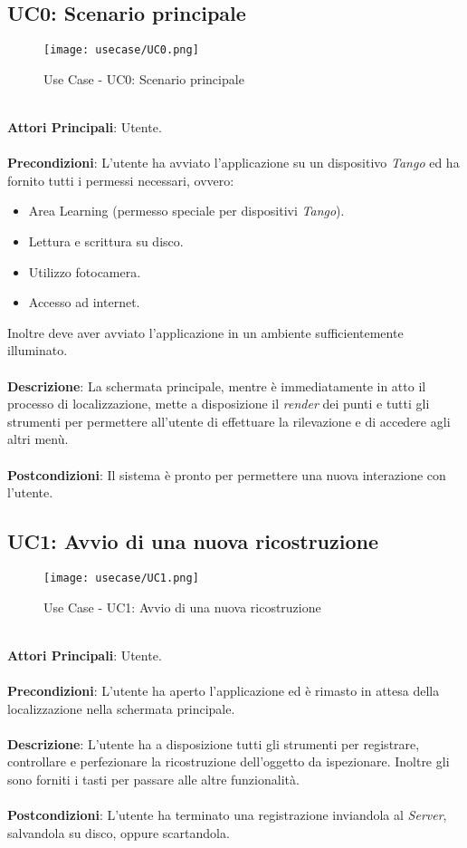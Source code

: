 \subsection{UC0: Scenario principale}
\begin{figure}[H] 
    \centering 
    \texttt{[image: usecase/UC0.png]} 
    \caption{Use Case - UC0: Scenario principale}
\end{figure}
\ \\
\textbf{Attori Principali}: Utente.
\\\\ \textbf{Precondizioni}: L'utente ha avviato l'applicazione su un dispositivo \emph{Tango} ed ha fornito tutti i permessi necessari, ovvero:
\begin{itemize}
	\item Area Learning (permesso speciale per dispositivi \emph{Tango}).
	\item Lettura e scrittura su disco.
	\item Utilizzo fotocamera.
	\item Accesso ad internet.
\end{itemize}
Inoltre deve aver avviato l'applicazione in un ambiente sufficientemente illuminato.
\\\\ \textbf{Descrizione}: La schermata principale, mentre è immediatamente in atto il processo di localizzazione, mette a disposizione il \emph{render} dei punti e tutti gli strumenti per permettere all'utente di effettuare la rilevazione e di accedere agli altri menù.
\\\\ \textbf{Postcondizioni}: Il sistema è pronto per permettere una nuova interazione con l'utente.


\subsection{UC1: Avvio di una nuova ricostruzione}
\begin{figure}[H] 
    \centering 
    \texttt{[image: usecase/UC1.png]} 
    \caption{Use Case - UC1: Avvio di una nuova ricostruzione}
\end{figure}
\ \\
\textbf{Attori Principali}: Utente.
\\\\ \textbf{Precondizioni}: L'utente ha aperto l'applicazione ed è rimasto in attesa della localizzazione nella schermata principale.
\\\\ \textbf{Descrizione}: L'utente ha a disposizione tutti gli strumenti per registrare, controllare e perfezionare la ricostruzione dell'oggetto da ispezionare. Inoltre gli sono forniti i tasti per passare alle altre funzionalità. 
\\\\ \textbf{Postcondizioni}: L'utente ha terminato una registrazione inviandola al \emph{Server}, salvandola su disco, oppure scartandola.



